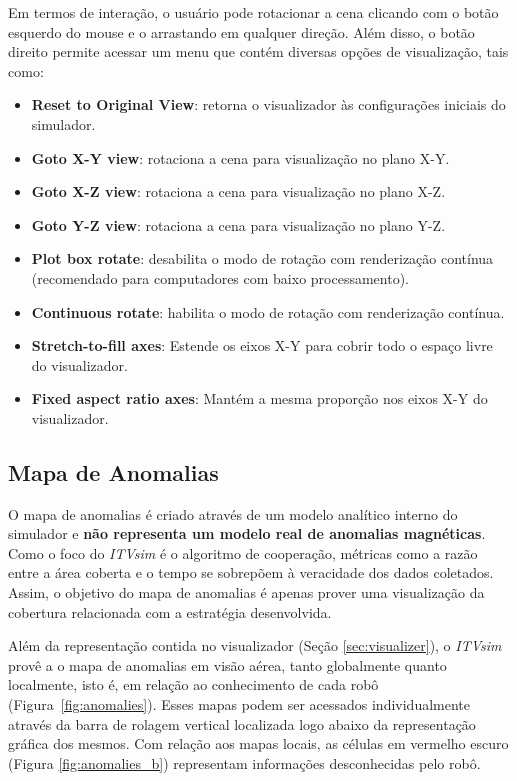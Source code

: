 \documentclass[11pt,a4paper]{article}
\begin{document}
Em termos de interação, o usuário pode rotacionar a cena clicando com
o botão esquerdo do mouse e o arrastando em qualquer direção. Além
disso, o botão direito permite acessar um menu que contém diversas
opções de visualização, tais como:

\begin{itemize}
\item\textbf{ Reset to Original View}: retorna o visualizador às
  configurações iniciais do simulador.
\item \textbf{Goto X-Y view}: rotaciona a cena para visualização no
  plano X-Y.
\item \textbf{Goto X-Z view}: rotaciona a cena para visualização no
  plano X-Z.
\item \textbf{Goto Y-Z view}: rotaciona a cena para visualização no
  plano Y-Z.
\item \textbf{Plot box rotate}: desabilita o modo de rotação com
  renderização contínua (recomendado para computadores com baixo
  processamento).
\item \textbf{Continuous rotate}: habilita o modo de rotação com
  renderização contínua.
\item \textbf{Stretch-to-fill axes}: Estende os eixos X-Y para cobrir
  todo o espaço livre do visualizador.
\item \textbf{Fixed aspect ratio axes}: Mantém a mesma proporção nos
  eixos X-Y do visualizador.
\end{itemize}

\subsection{Mapa de Anomalias}
O mapa de anomalias é criado através de um modelo analítico interno do
simulador e \textbf{não representa um modelo real de anomalias
  magnéticas}. Como o foco do \textit{ITVsim} é o algoritmo de
cooperação, métricas como a razão entre a área coberta e o tempo se
sobrepõem à veracidade dos dados coletados. Assim, o objetivo do mapa
de anomalias é apenas prover uma visualização da cobertura relacionada
com a estratégia desenvolvida.

Além da representação contida no visualizador (Seção
\ref{sec:visualizer}), o \textit{ITVsim} provê a o mapa de anomalias
em visão aérea, tanto globalmente quanto localmente, isto é, em
relação ao conhecimento de cada robô
(Figura~\ref{fig:anomalies}). Esses mapas podem ser acessados
individualmente através da barra de rolagem vertical localizada logo
abaixo da representação gráfica dos mesmos. Com relação aos mapas
locais, as células em vermelho escuro (Figura \ref{fig:anomalies_b})
representam informações desconhecidas pelo robô.
\end{document}
